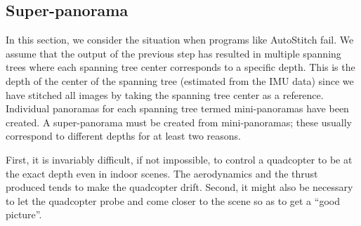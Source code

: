 \subsection{Super-panorama}
In this section, we consider the situation when programs like
AutoStitch fail.  We assume that the output of the previous step has
resulted in multiple spanning trees where each spanning tree center
corresponds to a specific depth. This is the depth of the center of
the spanning tree (estimated from the IMU data) since we have stitched all images by taking the
spanning tree center as a reference.  Individual panoramas for each
spanning tree termed mini-panoramas have been created. A
super-panorama must be created from mini-panoramas; these usually
correspond to different depths for at least two reasons.

First, it is invariably difficult, if not impossible, to control a
quadcopter to be at the exact depth even in indoor scenes.  The
aerodynamics and the thrust produced tends to make the quadcopter
drift.  Second, it might also be necessary to let the quadcopter probe
and come closer to the scene so as to get a ``good picture''.

